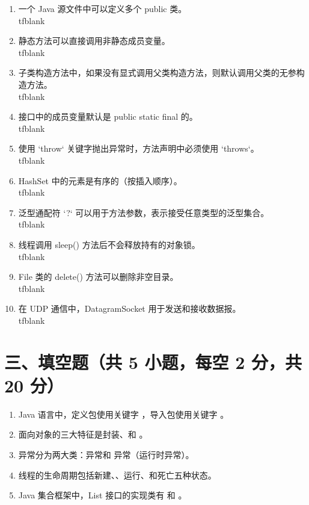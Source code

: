 \documentclass[a3paper, landscape, 11pt, twocolumn]{article}
\newcommand{\blank}{\underline{\hspace{2em}}}
\newcommand{\tfblank}{\underline{\hspace{1.5em}}}
\begin{document}
\begin{enumerate}[label=\arabic*., itemsep=0.5em]
	\item 一个 Java 源文件中可以定义多个 public 类。 \\tfblank
	\item 静态方法可以直接调用非静态成员变量。 \\tfblank
	\item 子类构造方法中，如果没有显式调用父类构造方法，则默认调用父类的无参构造方法。 \\tfblank
	\item 接口中的成员变量默认是 public static final 的。 \\tfblank
	\item 使用 `throw` 关键字抛出异常时，方法声明中必须使用 `throws`。 \\tfblank
	\item HashSet 中的元素是有序的（按插入顺序）。 \\tfblank
	\item 泛型通配符 `?` 可以用于方法参数，表示接受任意类型的泛型集合。 \\tfblank
	\item 线程调用 sleep() 方法后不会释放持有的对象锁。 \\tfblank
	\item File 类的 delete() 方法可以删除非空目录。 \\tfblank
	\item 在 UDP 通信中，DatagramSocket 用于发送和接收数据报。 \\tfblank
\end{enumerate}

\vspace{0.5cm}

\section*{三、填空题（共 5 小题，每空 2 分，共 20 分）}

\begin{enumerate}[label=\arabic*., itemsep=1em]
	\item Java 语言中，定义包使用关键字 \blank，导入包使用关键字 \blank。
	\item 面向对象的三大特征是封装、\blank 和 \blank。
	\item 异常分为两大类：\blank 异常和 \blank 异常（运行时异常）。
	\item 线程的生命周期包括新建、\blank、运行、\blank 和死亡五种状态。
	\item Java 集合框架中，List 接口的实现类有 \blank 和 \blank。
\end{enumerate}
\end{document}

